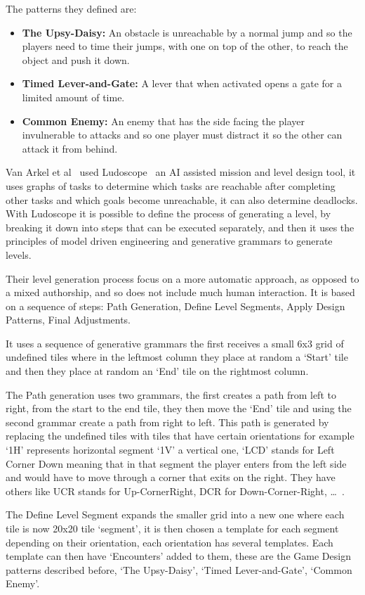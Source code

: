 \documentclass[runningheads]{llncs}
\begin{document}
The patterns they defined are:
\begin{itemize}
    \item\textbf{The Upsy-Daisy:} An obstacle is unreachable by a normal jump and so the players need to time their jumps, with one on top of the other, to reach the object and push it down.
    \item\textbf{Timed Lever-and-Gate:} A lever that when activated opens a gate for a limited amount of time.
    \item\textbf{Common Enemy:} An enemy that has the side facing the player invulnerable to attacks and so one player must distract it so the other can attack it from behind.
\end{itemize}

Van Arkel et al~\cite{ref_arkel} used Ludoscope~\cite{ref_dormans} an AI assisted mission and level design tool, it uses graphs of tasks to determine which tasks are reachable after completing other tasks and which goals become unreachable, it can also determine deadlocks. With Ludoscope it is possible to define the process of generating a level, by breaking it down into steps that can be executed separately, and then it uses the principles of model driven engineering and generative grammars to generate levels.

Their level generation process focus on a more automatic approach, as opposed to a mixed authorship, and so does not include much human interaction. It is based on a sequence of steps: Path Generation, Define Level Segments, Apply Design Patterns, Final Adjustments.

It uses a sequence of generative grammars the first receives a small 6x3 grid of undefined tiles where in the leftmost column they place at random a `Start' tile and then they place at random an `End' tile on the rightmost column.

The Path generation uses two grammars, the first creates a path from left to right, from the start to the end tile, they then move the `End' tile and using the second grammar create a path from right to left. This path is generated by replacing the undefined tiles with tiles that have certain orientations for example `1H' represents horizontal segment `1V' a vertical one, `LCD' stands for Left Corner Down meaning that in that segment the player enters from the left side and would have to move through a corner that exits on the right. They have others like UCR stands for Up-CornerRight, DCR for Down-Corner-Right, \ldots~.

The Define Level Segment expands the smaller grid into a new one where each tile is now 20x20 tile `segment', it is then chosen a template for each segment depending on their orientation, each orientation has several templates. Each template can then have `Encounters' added to them, these are the Game Design patterns described before, `The Upsy-Daisy', `Timed Lever-and-Gate', `Common Enemy'.
\end{document}
